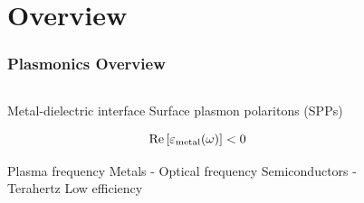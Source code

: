 \documentclass[mathserif,18pt,xcolor=table,c]{beamer}
\begin{document}
\section{Overview}
\begin{frame}
  \frametitle{Plasmonics Overview}
  \begin{columns} %
    \begin{column}{.5\textwidth}
      \begin{outline}[itemize]
        \1 Metal-dielectric interface
        \1 Surface plasmon polaritons (SPPs)
        \end{outline}
        \begin{equation} \nonumber
          \Re \left[ \varepsilon_{\text{metal}}(\omega)\right] < 0
        \end{equation}
        \begin{outline}[itemize]
        \1 Plasma frequency
          \2 Metals - Optical frequency
          \2 Semiconductors - Terahertz
        \1 Low efficiency
      \end{outline}
    \end{column}
    \begin{column}{.5\textwidth}
      \begin{figure}[b!]
        \hspace*{-1cm} \vspace*{0.5cm}
        \def\svgwidth{1.15\linewidth}
        
        \label{fig:spp}
      \end{figure}
      \end{column}%
    \end{columns}
  \end{frame}
\end{document}
